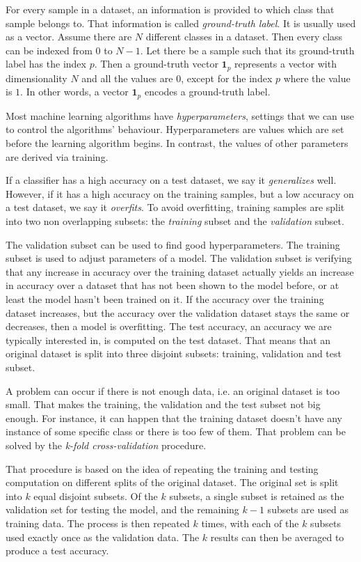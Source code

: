 For every sample in a dataset, an information is provided to which class that sample belongs to. That information is called \textit{ground-truth label}. It is usually used as a vector. Assume there are $N$ different classes in a dataset. Then every class can be indexed from $0$ to $N-1$. Let there be a sample such that its ground-truth label has the index $p$. Then a ground-truth vector $\pmb 1_p$ represents a vector with dimensionality $N$ and all the values are $0$, except for the index $p$ where the value is $1$. In other words, a vector $\pmb 1_p$ encodes a ground-truth label.

Most machine learning algorithms have \textit{hyperparameters}, settings that we can use to control the algorithms' behaviour. Hyperparameters are values which are set before the learning algorithm begins. In contrast, the values of other parameters are derived via training. 

If a classifier has a high accuracy on a test dataset, we say it \textit{generalizes} well. However, if it has a high accuracy on the training samples, but a low accuracy on a test dataset, we say it \textit{overfits}. To avoid overfitting, training samples are split into two non overlapping subsets: the \textit{training} subset and the \textit{validation} subset.

The validation subset can be used to find good hyperparameters. The training subset is used to adjust parameters of a model. The validation subset is verifying that any increase in accuracy over the training dataset actually yields an increase in accuracy over a dataset that has not been shown to the model before, or at least the model hasn't been trained on it. If the accuracy over the training dataset increases, but the accuracy over the validation dataset stays the same or decreases, then a model is overfitting. The test accuracy, an accuracy we are typically interested in, is computed on the test dataset. That means that an original dataset is split into three disjoint subsets: training, validation and test subset. 

A problem can occur if there is not enough data, i.e. an original dataset is too small. That makes the training, the validation and the test subset not big enough. For instance, it can happen that the training dataset doesn't have any instance of some specific class or there is too few of them. That problem can be solved by the \textit{k-fold cross-validation} procedure.

That procedure is based on the idea of repeating the training and testing computation on different splits of the original dataset. The original set is split into $k$ equal disjoint subsets. Of the $k$ subsets, a single subset is retained as the validation set for testing the model, and the remaining $k-1$ subsets are used as training data. The process is then repeated $k$ times, with each of the $k$ subsets used exactly once as the validation data. The $k$ results can then be averaged to produce a test accuracy. 

